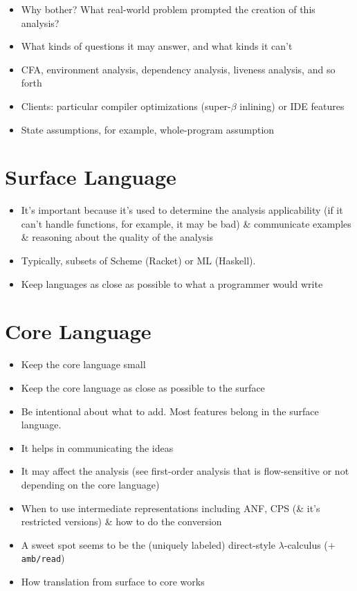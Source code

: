 \documentclass[12pt, oneside]{book}
\begin{document}
\begin{itemize}
  \item Why bother? What real-world problem prompted the creation of this analysis?
  \item What kinds of questions it may answer, and what kinds it can’t
  \item CFA, environment analysis, dependency analysis, liveness analysis, and so forth
  \item Clients: particular compiler optimizations (super-\(β\) inlining) or IDE features
  \item State assumptions, for example, whole-program assumption
\end{itemize}

\section{Surface Language}
\label{section:surface-language}

\begin{itemize}
  \item It’s important because it’s used to determine the analysis applicability (if it can’t handle functions, for example, it may be bad) \& communicate examples \& reasoning about the quality of the analysis
  \item Typically, subsets of Scheme (Racket) or ML (Haskell).
  \item Keep languages as close as possible to what a programmer would write
\end{itemize}

\section{Core Language}
\label{section:core-language}

\begin{itemize}
  \item Keep the core language small
  \item Keep the core language as close as possible to the surface
  \item Be intentional about what to add. Most features belong in the surface language.
  \item It helps in communicating the ideas
  \item It may affect the analysis (see first-order analysis that is flow-sensitive or not depending on the core language)
  \item When to use intermediate representations including ANF, CPS (\& it’s restricted versions) \& how to do the conversion
  \item A sweet spot seems to be the (uniquely labeled) direct-style \(λ\)-calculus (+ \texttt{amb/read})
  \item How translation from surface to core works
\end{itemize}
\end{document}
